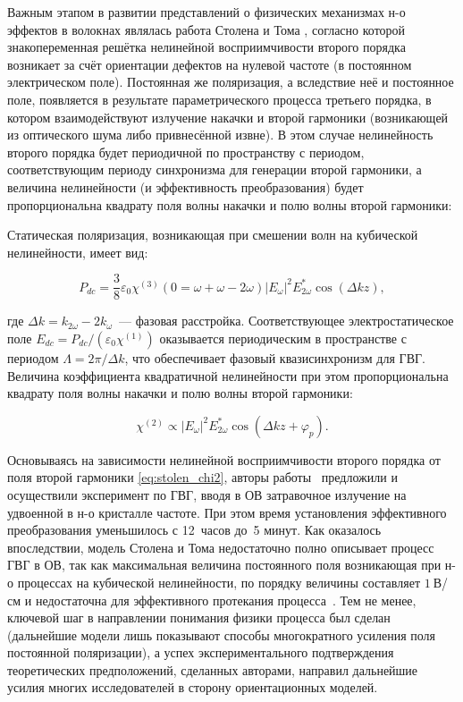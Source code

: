 Важным этапом в развитии представлений о физических механизмах н-о эффектов в волокнах являлась работа Столена и Тома \cite{stolen1987self}, согласно которой знакопеременная решётка нелинейной восприимчивости второго порядка возникает за счёт ориентации дефектов на нулевой частоте (в постоянном электрическом поле). Постоянная же поляризация, а вследствие неё и постоянное поле, появляется в результате параметрического процесса третьего порядка, в котором взаимодействуют излучение накачки и второй гармоники (возникающей из оптического шума либо привнесённой извне). В этом случае нелинейность второго порядка будет периодичной по пространству с периодом, соответствующим периоду синхронизма для генерации второй гармоники, а величина нелинейности (и эффективность преобразования) будет пропорциональна квадрату поля волны накачки и полю волны второй гармоники:

Статическая поляризация, возникающая при смешении волн на кубической нелинейности, имеет вид:

\begin{equation}\label{eq:stolen_pdc}
	P_{dc} = \frac{3}{8} \varepsilon_0 \chi^{(3)}(0 = \omega + \omega - 2\omega) |E_\omega|^2 E_{2\omega}^* \cos(\Delta k z),
\end{equation}

где $\Delta k = k_{2\omega} - 2k_\omega$~--- фазовая расстройка. Соответствующее электростатическое поле $E_{dc} = P_{dc}/(\varepsilon_0 \chi^{(1)})$ оказывается периодическим в пространстве с периодом $\Lambda = 2\pi/\Delta k$, что обеспечивает фазовый квазисинхронизм для ГВГ. Величина коэффициента квадратичной нелинейности при этом пропорциональна квадрату поля волны накачки и полю волны второй гармоники:

\begin{equation}\label{eq:stolen_chi2}
	\chi^{(2)} \propto |E_\omega|^2 E_{2\omega}^* \cos(\Delta k z + \varphi_p).
\end{equation}

Основываясь на зависимости нелинейной восприимчивости второго порядка от поля второй гармоники \cref{eq:stolen_chi2}, авторы работы~\cite{stolen1987self} предложили и осуществили эксперимент по ГВГ, вводя в ОВ затравочное излучение на удвоенной в н-о кристалле частоте. При этом время установления эффективного преобразования уменьшилось с 12~часов до~5 минут. Как оказалось впоследствии, модель Столена и Тома недостаточно полно описывает процесс ГВГ в ОВ, так как максимальная величина постоянного поля возникающая при н-о процессах на кубической нелинейности, по порядку величины составляет $1~$В/см и недостаточна для эффективного протекания процесса~\cite{bergot1988generation}. Тем не менее, ключевой шаг в направлении понимания физики процесса был сделан (дальнейшие модели лишь показывают способы многократного усиления поля постоянной поляризации), а успех экспериментального подтверждения теоретических предположений, сделанных авторами, направил дальнейшие усилия многих исследователей в сторону ориентационных моделей. 


